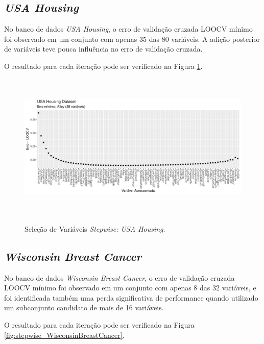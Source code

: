 \subsection{\textit{USA Housing}}
No banco de dados \textit{USA Housing}, o erro de validação cruzada LOOCV mínimo foi observado em um conjunto com apenas 35 das 80 variáveis. A adição posterior de variáveis teve pouca influência no erro de validação cruzada. 

O resultado para cada iteração pode ser verificado na Figura \ref{fig:stepwise_USAHousingDataset_validation}.

\begin{figure}[!htb]
    \centering
    \caption{Seleção de Variáveis \textit{Stepwise: USA Housing}.}
    \includegraphics[height=200pt]{imgs/res/USAHousingDataset_validation.pdf}
    \label{fig:stepwise_USAHousingDataset_validation}
\end{figure}
\FloatBarrier

\subsection{\textit{Wisconsin Breast Cancer}}
No banco de dados \textit{Wisconsin Breast Cancer}, o erro de validação cruzada LOOCV mínimo foi observado em um conjunto com apenas 8 das 32 variáveis, e foi identificada também uma perda significativa de performance quando utilizado um subconjunto candidato de mais de 16 variáveis. 

O resultado para cada iteração pode ser verificado na Figura \ref{fig:stepwise_WisconsinBreastCancer}.

